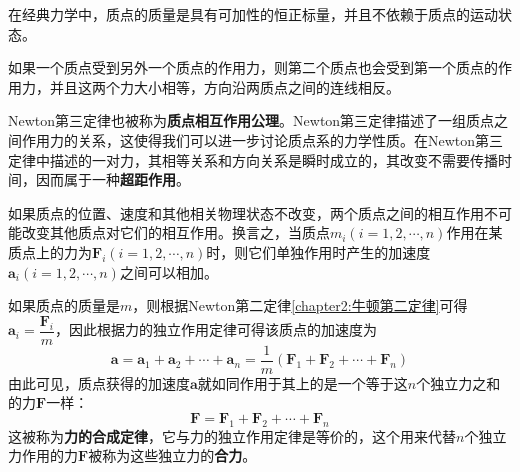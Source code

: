 在经典力学中，质点的质量是具有可加性的恒正标量，并且不依赖于质点的运动状态。


\begin{law}[Newton第三定律]
	如果一个质点受到另外一个质点的作用力，则第二个质点也会受到第一个质点的作用力，并且这两个力大小相等，方向沿两质点之间的连线相反。
\end{law}

Newton第三定律也被称为{\bf 质点相互作用公理}。Newton第三定律描述了一组质点之间作用力的关系，这使得我们可以进一步讨论质点系的力学性质。在Newton第三定律中描述的一对力，其相等关系和方向关系是瞬时成立的，其改变不需要传播时间，因而属于一种{\bf 超距作用}。


\begin{law}[力的独立作用定律]
	如果质点的位置、速度和其他相关物理状态不改变，两个质点之间的相互作用不可能改变其他质点对它们的相互作用。换言之，当质点$m_i(i=1,2,\cdots,n)$作用在某质点上的力为$\boldsymbol{F}_i(i=1,2,\cdots,n)$时，则它们单独作用时产生的加速度$\boldsymbol{a}_i(i=1,2,\cdots,n)$之间可以相加。
\end{law}

如果质点的质量是$m$，则根据Newton第二定律\eqref{chapter2:牛顿第二定律}可得$\boldsymbol{a}_i = \dfrac{\boldsymbol{F}_i}{m}$，因此根据力的独立作用定律可得该质点的加速度为
\begin{equation}
	\boldsymbol{a} = \boldsymbol{a}_1 + \boldsymbol{a}_2 + \cdots + \boldsymbol{a}_n = \frac{1}{m}\left(\boldsymbol{F}_1 + \boldsymbol{F}_2 + \cdots + \boldsymbol{F}_n\right)
\end{equation}
由此可见，质点获得的加速度$\boldsymbol{a}$就如同作用于其上的是一个等于这$n$个独立力之和的力$\boldsymbol{F}$一样：
\begin{equation}
	\boldsymbol{F} = \boldsymbol{F}_1 + \boldsymbol{F}_2 + \cdots + \boldsymbol{F}_n
\end{equation}
这被称为{\bf 力的合成定律}，它与力的独立作用定律是等价的，这个用来代替$n$个独立力作用的力$\boldsymbol{F}$被称为这些独立力的{\bf 合力}。

